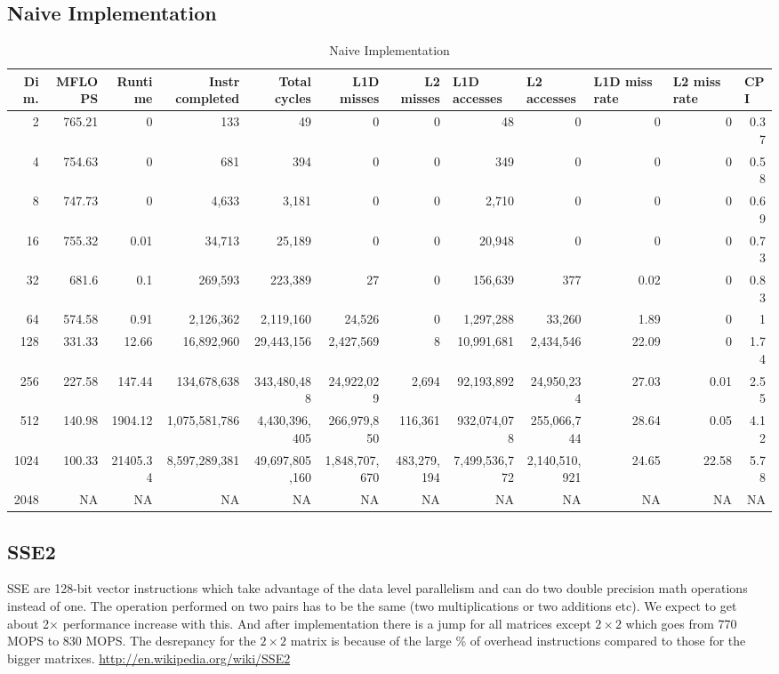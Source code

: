 \documentclass{article}
\begin{document}
\subsection{Naive Implementation}
\begin{table}[htbp]
\tiny
\caption{Naive Implementation}
\begin{tabular}{|r|r|r|r|r|r|r|r|r|r|r|r|}
\hline
Dim. &   MFLOPS &     Runtime & Instr completed & Total cycles & L1D misses & L2 misses & \multicolumn{1}{l|}{L1D accesses} & \multicolumn{1}{l|}{ L2 accesses} & \multicolumn{1}{l|}{L1D miss rate} & \multicolumn{1}{l|}{L2 miss rate} & \multicolumn{1}{l|}{CPI} \\ \hline
2 & 765.21 & 0 & 133 & 49 & 0 & 0 & 48 & 0 & 0 & 0 & 0.37 \\ \hline
4 & 754.63 & 0 & 681 & 394 & 0 & 0 & 349 & 0 & 0 & 0 & 0.58 \\ \hline
8 & 747.73 & 0 & 4,633 & 3,181 & 0 & 0 & 2,710 & 0 & 0 & 0 & 0.69 \\ \hline
16 & 755.32 & 0.01 & 34,713 & 25,189 & 0 & 0 & 20,948 & 0 & 0 & 0 & 0.73 \\ \hline
32 & 681.6 & 0.1 & 269,593 & 223,389 & 27 & 0 & 156,639 & 377 & 0.02 & 0 & 0.83 \\ \hline
64 & 574.58 & 0.91 & 2,126,362 & 2,119,160 & 24,526 & 0 & 1,297,288 & 33,260 & 1.89 & 0 & 1 \\ \hline
128 & 331.33 & 12.66 & 16,892,960 & 29,443,156 & 2,427,569 & 8 & 10,991,681 & 2,434,546 & 22.09 & 0 & 1.74 \\ \hline
256 & 227.58 & 147.44 & 134,678,638 & 343,480,488 & 24,922,029 & 2,694 & 92,193,892 & 24,950,234 & 27.03 & 0.01 & 2.55 \\ \hline
512 & 140.98 & 1904.12 & 1,075,581,786 & 4,430,396,405 & 266,979,850 & 116,361 & 932,074,078 & 255,066,744 & 28.64 & 0.05 & 4.12 \\ \hline
1024 & 100.33 & 21405.34 & 8,597,289,381 & 49,697,805,160 & 1,848,707,670 & 483,279,194 & 7,499,536,772 & 2,140,510,921 & 24.65 & 22.58 & 5.78 \\ \hline
2048 & NA & NA & NA & NA & NA & NA & NA & NA & NA & NA & NA \\ \hline
\end{tabular}
\label{}
\end{table}

\subsection{SSE2}
SSE are 128-bit vector instructions which take advantage of the data level parallelism and can do two double precision math operations instead of one.  The operation performed on two pairs has to be the same (two multiplications or two additions etc). We expect to get about 2$\times$ performance increase with this. And after implementation there is a jump for all matrices except $2\times 2$ which goes from 770 MOPS to 830 MOPS. The desrepancy for the $2\times2$ matrix is because of the large \% of overhead instructions compared to those for the bigger matrixes.
\url{http://en.wikipedia.org/wiki/SSE2}
\end{document}

